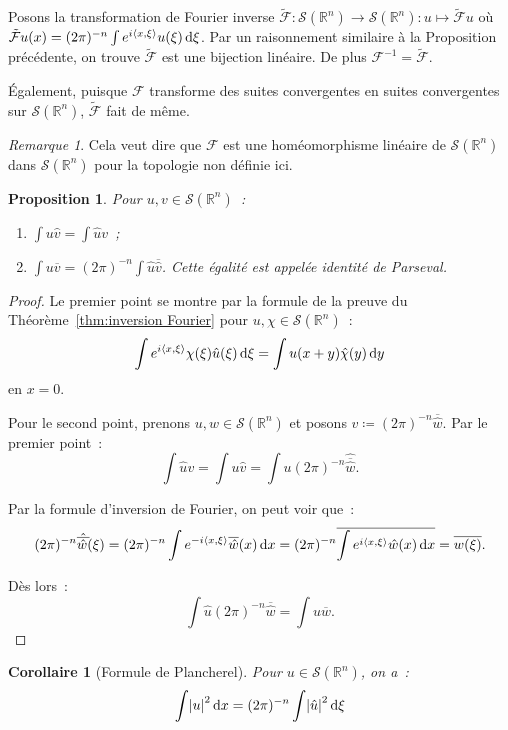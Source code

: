 \documentclass{report}
\newcommand{\R}{{\mathbb R}}
\newcommand{\scpr}[2]{\left\langle#1, #2\right\rangle}
\newcommand{\dx}{\dif x}
\newtheorem{prp}[thm]{Proposition}
\newtheorem{cor}[thm]{Corollaire}
\theoremstyle{definition}
\theoremstyle{remark}
\newtheorem*{rmq}{Remarque}
\begin{document}
Posons la transformation de Fourier inverse $\tilde {\mathcal F} : \mathcal S(\R^n) \to \mathcal S(\R^n) : u \mapsto \tilde {\mathcal F}u$ où
$\tilde {\mathcal F}u(x) = (2\pi)^{-n}\int e^{i\scpr x\xi}u(\xi)\dif\xi$. Par un raisonnement similaire à la Proposition précédente,
on trouve $\tilde {\mathcal F}$ est une bijection linéaire. De plus $\mathcal F^{-1} = \tilde {\mathcal F}$.

Également, puisque $\mathcal F$ transforme des suites convergentes en suites convergentes sur $\mathcal S(\R^n)$, $\tilde {\mathcal F}$ fait de même.

\begin{rmq} Cela veut dire que $\mathcal F$ est une homéomorphisme linéaire de $\mathcal S(\R^n)$ dans $\mathcal S(\R^n)$ pour la topologie non définie ici.
\end{rmq}

\begin{prp} Pour $u, v \in \mathcal S(\R^n)$~:
\begin{enumerate}
	\item $\int u\hat v = \int\hat uv$~;
	\item $\int u\overline v = (2\pi)^{-n}\int \hat u\overline {\hat v}$. Cette égalité est appelée \textit{identité de Parseval}.
\end{enumerate}
\end{prp}

\begin{proof} Le premier point se montre par la formule de la preuve du Théorème~\ref{thm:inversion Fourier} pour $u,\chi \in \mathcal S(\R^n)$~:
\[\int e^{i\scpr x\xi}\chi(\xi)\hat u(\xi)\dif\xi = \int u(x+y)\hat \chi(y)\dif y\]
en $x=0$.

Pour le second point, prenons $u, w \in \mathcal S(\R^n)$ et posons $v \coloneqq (2\pi)^{-n}\overline {\hat w}$. Par le premier point~:
\[\int \hat uv = \int u\hat v = \int u(2\pi)^{-n}\hat {\overline {\hat w}}.\]

Par la formule d'inversion de Fourier, on peut voir que~:
\[(2\pi)^{-n}\hat {\overline {\hat w}}(\xi) = (2\pi)^{-n}\int e^{-i\scpr x\xi}\overline {\hat w}(x)\dx =
	(2\pi)^{-n}\overline {\int e^{i\scpr x\xi}\hat w(x)\dx} = \overline {w(\xi)}.\]

Dès lors~:
\[\int \hat u(2\pi)^{-n}\overline {\hat w} = \int u\overline w.\]
\end{proof}

\begin{cor}[Formule de Plancherel] Pour $u \in \mathcal S(\R^n)$, on a~:
\begin{equation}\label{eq:Plancherel}
	\int \abs u^2\dx = (2\pi)^{-n}\int\abs {\hat u}^2\dif\xi
\end{equation}
\end{cor}
\end{document}
